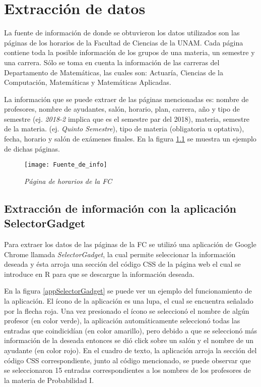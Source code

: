 \chapter{Extracción de datos}

La fuente de información de donde se obtuvieron los datos utilizados son las páginas de los horarios de la Facultad de Ciencias de la UNAM. Cada página contiene toda la posible información de los grupos de una materia, un semestre y una carrera. Sólo se toma en cuenta la información de las carreras del Departamento de Matemáticas, las cuales son: Actuaría, Ciencias de la Computación, Matemáticas y Matemáticas Aplicadas.

La información que se puede extraer de las páginas mencionadas es: nombre de profesores, nombre de ayudantes, salón, horario, plan, carrera, año y tipo de semestre (ej. \textit{2018-2} implica que es el semestre par del 2018), materia, semestre de la materia. (ej. \textit{Quinto Semestre}), tipo de materia (obligatoria u optativa), fecha, horario y salón de exámenes finales. En la figura \ref{pagFC} se muestra un ejemplo de dichas páginas.

\begin{figure}[H]
\centering
\texttt{[image: Fuente\_de\_info]} %
\caption{\textit{Página de horarios de la FC}}\label{pagFC}
\end{figure}

\section{Extracción de información con la aplicación SelectorGadget}

Para extraer los datos de las páginas de la FC se utilizó una aplicación de Google Chrome llamada \textit{SelectorGadget}, la cual permite seleccionar la información deseada y ésta arroja una sección del código CSS de la página web el cual se introduce en R para que se descargue la información deseada.

En la figura \ref{appSelectorGadget} se puede ver un ejemplo del funcionamiento de la aplicación. El ícono de la aplicación es una lupa, el cual se encuentra señalado por la flecha roja. Una vez presionado el ícono se seleccionó el nombre de algún profesor (en color verde), la aplicación automáticamente seleccionó todas las entradas que coindicidían (en color amarillo), pero debido a que se seleccionó más información de la deseada entonces se dió click sobre un salón y el nombre de un ayudante (en color rojo). En el cuadro de texto, la aplicación arroja la sección del código CSS correspondiente, junto al código mencionado, se puede observar que se seleccionaron 15 entradas correspondientes a los nombres de los profesores de la materia de Probabilidad I.

